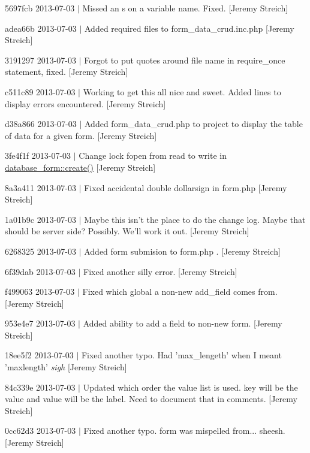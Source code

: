 \begin{DoxyItemize}
\item 5697fcb 2013-\/07-\/03 $|$ Missed an s on a variable name. Fixed. \mbox{[}Jeremy Streich\mbox{]}
\item adea66b 2013-\/07-\/03 $|$ Added required files to form\-\_\-data\-\_\-crud.\-inc.\-php \mbox{[}Jeremy Streich\mbox{]}
\item 3191297 2013-\/07-\/03 $|$ Forgot to put quotes around file name in require\-\_\-once statement, fixed. \mbox{[}Jeremy Streich\mbox{]}
\item c511c89 2013-\/07-\/03 $|$ Working to get this all nice and sweet. Added lines to display errors encountered. \mbox{[}Jeremy Streich\mbox{]}
\item d38a866 2013-\/07-\/03 $|$ Added form\-\_\-data\-\_\-crud.\-php to project to display the table of data for a given form. \mbox{[}Jeremy Streich\mbox{]}
\item 3fe4f1f 2013-\/07-\/03 $|$ Change lock fopen from read to write in \hyperlink{classdatabase__form_a2f217d182a55038d501b66f2a2d51abc}{database\-\_\-form\-::create()} \mbox{[}Jeremy Streich\mbox{]}
\item 8a3a411 2013-\/07-\/03 $|$ Fixed accidental double dollarsign in form.\-php \mbox{[}Jeremy Streich\mbox{]}
\item 1a01b9c 2013-\/07-\/03 $|$ Maybe this isn't the place to do the change log. Maybe that should be server side? Possibly. We'll work it out. \mbox{[}Jeremy Streich\mbox{]}
\item 6268325 2013-\/07-\/03 $|$ Added form submision to form.\-php . \mbox{[}Jeremy Streich\mbox{]}
\item 6f39dab 2013-\/07-\/03 $|$ Fixed another silly error. \mbox{[}Jeremy Streich\mbox{]}
\item f499063 2013-\/07-\/03 $|$ Fixed which global a non-\/new add\-\_\-field comes from. \mbox{[}Jeremy Streich\mbox{]}
\item 953e4e7 2013-\/07-\/03 $|$ Added ability to add a field to non-\/new form. \mbox{[}Jeremy Streich\mbox{]}
\item 18ee5f2 2013-\/07-\/03 $|$ Fixed another typo. Had 'max\-\_\-lengeth' when I meant 'maxlength' {\itshape sigh} \mbox{[}Jeremy Streich\mbox{]}
\item 84c339e 2013-\/07-\/03 $|$ Updated which order the value list is used. key will be the value and value will be the label. Need to document that in comments. \mbox{[}Jeremy Streich\mbox{]}
\item 0cc62d3 2013-\/07-\/03 $|$ Fixed another typo. form was mispelled from... sheesh. \mbox{[}Jeremy Streich\mbox{]}

\end{DoxyItemize}
